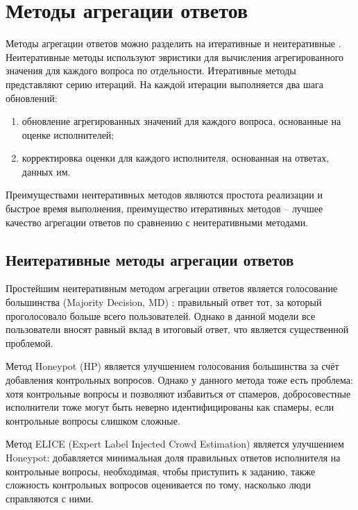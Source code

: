 \documentclass[specification,annotation,times]{itmo-student-thesis}
\begin{document}
\section{Методы агрегации ответов}
Методы агрегации ответов можно разделить на итеративные и неитеративные \cite{hung2013evaluation}. Неитеративные методы используют эвристики для вычисления агрегированного значения для каждого вопроса по отдельности. Итеративные методы представляют серию итераций. На каждой итерации выполняется два шага обновлений:
\begin{enumerate}
    \item обновление агрегированных значений для каждого вопроса, основанные на оценке исполнителей;
    \item корректировка оценки для каждого исполнителя, основанная на ответах, данных им.
\end{enumerate}

Преимуществами неитеративных методов являются простота реализации и быстрое время выполнения, преимущество итеративных методов -- лучшее качество агрегации ответов по сравнению с неитеративными методами.

\subsection{Неитеративные методы агрегации ответов}
Простейшим неитеративным методом агрегации ответов является голосование большинства (Majority Decision, MD) \cite{kuncheva2003limits}: правильный ответ тот, за который проголосовало больше всего пользователей. Однако в данной модели все пользователи вносят равный вклад в итоговый ответ, что является существенной проблемой.

Метод Honeypot (HP) \cite{lee2010social} является улучшением голосования большинства за счёт добавления контрольных вопросов. Однако у данного метода тоже есть проблема: хотя контрольные вопросы и позволяют избавиться от спамеров, добросовестные исполнители тоже могут быть неверно идентифицированы как спамеры, если контрольные вопросы слишком сложные.

Метод ELICE (Expert Label Injected Crowd Estimation) \cite{khattak2011quality} является улучшением Honeypot: добавляется минимальная доля правильных ответов исполнителя на контрольные вопросы, необходимая, чтобы приступить к заданию, также сложность контрольных вопросов оценивается по тому, насколько люди справляются с ними.
\end{document}
